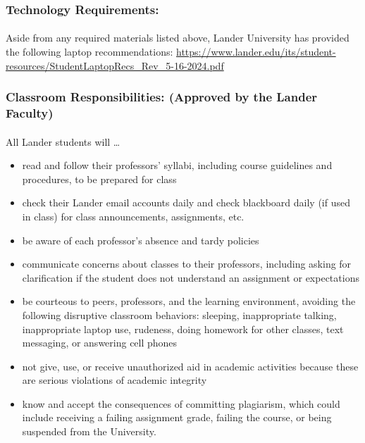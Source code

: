 \documentclass{article}
\begin{document}
    \begin{samepage}
      \subsubsection*{Technology Requirements:}
        \paragraph*{}
        Aside from any required materials listed above, Lander University has provided the following laptop recommendations: 
        \href{https://www.lander.edu/its/student-resources/StudentLaptopRecs_Rev_5-16-2024.pdf}{https://www.lander.edu/its/student-resources/StudentLaptopRecs\_Rev\_5-16-2024.pdf}

    \end{samepage}

      \subsubsection*{Classroom Responsibilities: (Approved by the Lander Faculty)}
        \paragraph*{}
        All Lander students will \dots
        \begin{itemize}
          \item read and follow their professors' syllabi, including course guidelines and procedures, to be prepared for class
          \item check their Lander email accounts daily and check blackboard daily (if used in class) for class announcements, assignments, etc.
          \item be aware of each professor’s absence and tardy policies
          \item communicate concerns about classes to their professors, including asking for clarification if the student does not understand an assignment or expectations
          \item be courteous to peers, professors, and the learning environment, avoiding the following disruptive classroom behaviors: sleeping, inappropriate talking, inappropriate laptop use, rudeness, doing homework for other classes, text messaging, or answering cell phones
          \item not give, use, or receive unauthorized aid in academic activities because these are serious violations of academic integrity
          \item know and accept the consequences of committing plagiarism, which could include receiving a failing assignment grade, failing the course, or being suspended from the University.
        \end{itemize}
\end{document}
